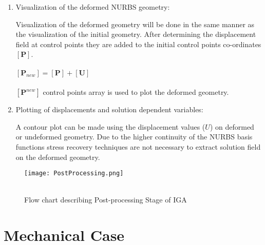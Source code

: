 \documentclass[11pt]{article}
\begin{document}
\begin{enumerate}[leftmargin=*]
	\item Visualization of the deformed NURBS geometry:
	
	Visualization of the deformed geometry will be done in the same manner as the
	visualization of the initial geometry. After determining the displacement field
	at control points they are added to the initial control points co-ordinates
	$[\textbf{P}]$.\\
	\\
	$[\textbf{P}_{new}]=[\textbf{P}]+[\textbf{U}]$ \\
	\\
	$[\textbf{P}^{new}]$ control points array is used to plot the deformed
	geometry.
	
	\item Plotting of displacements and solution dependent variables:
	
	A contour plot can be made using the displacement values ($U$) on deformed or undeformed geometry.
	Due to the higher continuity of the NURBS basis functions stress recovery techniques are not necessary to extract solution field on the deformed geometry.  
	
\end{enumerate}

\begin{figure}[H]
	\begin{center}
		\texttt{[image: PostProcessing.png]} 
		\caption{\\Flow chart describing Post-processing Stage of IGA}\label{PostProcessing}
	\end{center}
	
\end{figure}


\section{Mechanical Case}
\end{document}
